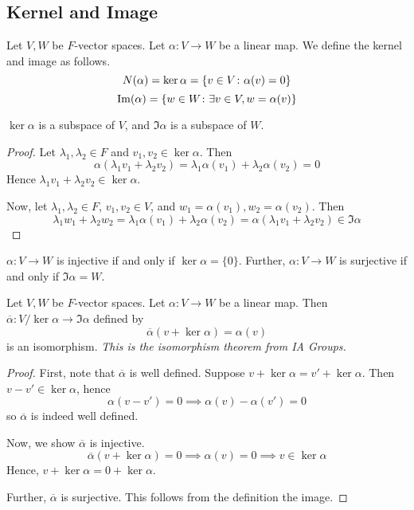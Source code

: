 \subsection{Kernel and Image}
\begin{definition}
    Let \( V, W \) be \( F \)-vector spaces.
    Let \( \alpha \colon V \to W \) be a linear map.
    We define the kernel and image as follows.
    \[ N(\alpha) = \ker\alpha = \qty{v \in V \colon \alpha(v) = 0} \]
    \[ \Im(\alpha) = \qty{w \in W \colon \exists v \in V, w = \alpha(v)} \]
\end{definition}
\begin{lemma}
    \( \ker \alpha \) is a subspace of \( V \), and \( \Im \alpha \) is a subspace of \( W \).
\end{lemma}
\begin{proof}
    Let \( \lambda_1, \lambda_2 \in F \) and \( v_1, v_2 \in \ker \alpha \).
    Then
    \[ \alpha(\lambda_1 v_1 + \lambda_2 v_2) = \lambda_1 \alpha(v_1) + \lambda_2 \alpha(v_2) = 0 \]
    Hence \( \lambda_1 v_1 + \lambda_2 v_2 \in \ker \alpha \).

    Now, let \( \lambda_1, \lambda_2 \in F \), \( v_1, v_2 \in V \), and \( w_1 = \alpha(v_1), w_2 = \alpha(v_2) \).
    Then
    \[ \lambda_1 w_1 + \lambda_2 w_2 = \lambda_1 \alpha(v_1) + \lambda_2 \alpha(v_2) = \alpha(\lambda_1 v_1 + \lambda_2 v_2) \in \Im \alpha \]
\end{proof}
\begin{remark}
    \( \alpha \colon V \to W \) is injective if and only if \( \ker \alpha = \{ 0 \} \).
    Further, \( \alpha \colon V \to W \) is surjective if and only if \( \Im \alpha = W \).
\end{remark}
\begin{theorem}
    Let \( V, W \) be \( F \)-vector spaces.
    Let \( \alpha \colon V \to W \) be a linear map.
    Then \( \overline \alpha \colon V / \ker \alpha \to \Im \alpha \) defined by
    \[ \overline \alpha (v + \ker \alpha) = \alpha(v) \]
    is an isomorphism.
    \textit{This is the isomorphism theorem from IA Groups.}
\end{theorem}
\begin{proof}
    First, note that \( \overline\alpha \) is well defined.
    Suppose \( v + \ker \alpha = v' + \ker \alpha \).
    Then \( v - v' \in \ker \alpha \), hence
    \[ \alpha(v - v') = 0 \implies \alpha(v) - \alpha(v') = 0 \]
    so \( \overline\alpha \) is indeed well defined.

    Now, we show \( \overline\alpha \) is injective.
    \[ \overline\alpha(v + \ker \alpha) = 0 \implies \alpha(v) = 0 \implies v \in \ker \alpha \]
    Hence, \( v + \ker \alpha = 0 + \ker \alpha \).

    Further, \( \overline\alpha \) is surjective.
    This follows from the definition the image.
\end{proof}

